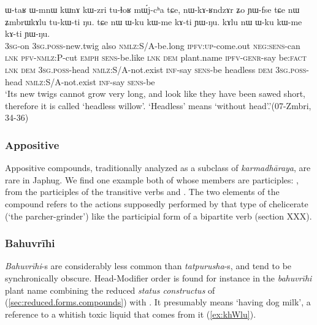 \begin{exe}
\ex \label{ex:kAlu}  
\gll ɯ-taʁ ɯ-mnɯ kɯnɤ kɯ-zri tu-ɬoʁ mɯ́j-cʰa tɕe, nɯ-kɤ-ʁndzɤr ʑo ɲɯ-fse tɕe nɯ ʑmbrɯkɤlu tu-kɯ-ti ŋu. tɕe nɯ ɯ-ku kɯ-me kɤ-ti ɲɯ-ŋu.  kɤlu nɯ ɯ-ku kɯ-me kɤ-ti ɲɯ-ŋu.\\
\textsc{3sg}-on \textsc{3sg.poss}-new.twig also \textsc{nmlz}:S/A-be.long \textsc{ipfv}:\textsc{up}-come.out \textsc{neg:sens}-can \textsc{lnk} \textsc{pfv}-\textsc{nmlz}:P-cut \textsc{emph} \textsc{sens}-be.like \textsc{lnk} \textsc{dem} plant.name \textsc{ipfv}-\textsc{genr}-say be:\textsc{fact} \textsc{lnk}  \textsc{dem} \textsc{3sg.poss}-head \textsc{nmlz}:S/A-not.exist \textsc{inf}-say \textsc{sens}-be headless \textsc{dem} \textsc{3sg.poss}-head \textsc{nmlz}:S/A-not.exist \textsc{inf}-say \textsc{sens}-be\\
\glt `Its new twigs cannot grow very long, and look like they have been sawed short, therefore it is called `headless willow'. `Headless' means `without head'.'(07-Zmbri, 34-36)
\end{exe}

\subsubsection{Appositive} \label{sec:appositive.n.n}
Appositive compounds, traditionally analyzed as a subclass of \textit{karmadhāraya}, are rare in Japhug. We find one example both of whose members are participles: , from the  participles of the transitive verbs  and  . The two elements of the compound refers to the actions supposedly performed by that type of chelicerate (`the parcher-grinder') like the participial form of a bipartite verb (section XXX).


\subsubsection{Bahuvrīhi} \label{sec:bahuvrihi.n.n}
\textit{Bahuvrīhi}-s are considerably less common than \textit{tatpurusha}-s, and tend to be synchronically obscure. Head-Modifier order is found for instance in the \textit{bahuvrīhi} plant name   combining the reduced \textit{status constructus} of  (\ref{sec:reduced.forms.compounds}) with . It presumably means `having dog milk', a reference to a whitish toxic liquid that comes from it (\ref{ex:khWlu}).

